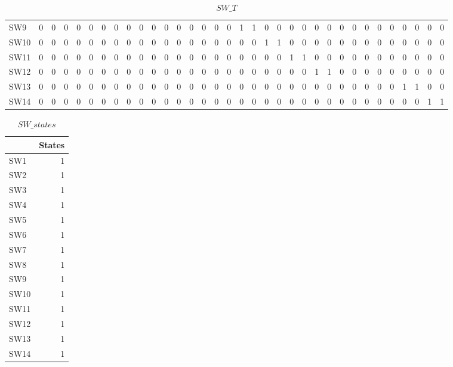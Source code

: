 \documentclass[nols,a4paper,twoside,notoc,fleqn]{tufte-book}
\begin{document}
\begin{table}[h!]
{\begin{tabular}{lrrrrrrrrrrrrrrrrrrrrrrrrrrrrrrrrr}
	SW9  &   0 &   0 &   0 &   0 &   0 &   0 &   0 &   0 &   0 &    0 &    0 &    0 &    0 &    0 &    0 &    0 &    1 &    1 &    0 &    0 &    0 &    0 &    0 &    0 &    0 &    0 &    0 &    0 &    0 &    0 &    0 &    0 &    0 \\
	SW10 &   0 &   0 &   0 &   0 &   0 &   0 &   0 &   0 &   0 &    0 &    0 &    0 &    0 &    0 &    0 &    0 &    0 &    0 &    1 &    1 &    0 &    0 &    0 &    0 &    0 &    0 &    0 &    0 &    0 &    0 &    0 &    0 &    0 \\
	SW11 &   0 &   0 &   0 &   0 &   0 &   0 &   0 &   0 &   0 &    0 &    0 &    0 &    0 &    0 &    0 &    0 &    0 &    0 &    0 &    0 &    1 &    1 &    0 &    0 &    0 &    0 &    0 &    0 &    0 &    0 &    0 &    0 &    0 \\
	SW12 &   0 &   0 &   0 &   0 &   0 &   0 &   0 &   0 &   0 &    0 &    0 &    0 &    0 &    0 &    0 &    0 &    0 &    0 &    0 &    0 &    0 &    0 &    1 &    1 &    0 &    0 &    0 &    0 &    0 &    0 &    0 &    0 &    0 \\
	SW13 &   0 &   0 &   0 &   0 &   0 &   0 &   0 &   0 &   0 &    0 &    0 &    0 &    0 &    0 &    0 &    0 &    0 &    0 &    0 &    0 &    0 &    0 &    0 &    0 &    0 &    0 &    0 &    0 &    0 &    1 &    1 &    0 &    0 \\
	SW14 &   0 &   0 &   0 &   0 &   0 &   0 &   0 &   0 &   0 &    0 &    0 &    0 &    0 &    0 &    0 &    0 &    0 &    0 &    0 &    0 &    0 &    0 &    0 &    0 &    0 &    0 &    0 &    0 &    0 &    0 &    0 &    1 &    1 \\
	\bottomrule
\end{tabular}
}
\caption{$SW\_T$}
\end{table}


\begin{table}[h!]
	\begin{tabular}{lr}
		\toprule
		{} &  States \\
		\midrule
		SW1  &       1 \\
		SW2  &       1 \\
		SW3  &       1 \\
		SW4  &       1 \\
		SW5  &       1 \\
		SW6  &       1 \\
		SW7  &       1 \\
		SW8  &       1 \\
		SW9  &       1 \\
		SW10 &       1 \\
		SW11 &       1 \\
		SW12 &       1 \\
		SW13 &       1 \\
		SW14 &       1 \\
		\bottomrule
	\end{tabular}
	\caption{$SW\_states$}
\end{table}
\end{document}
